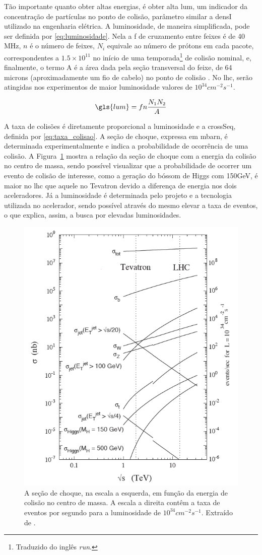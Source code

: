 Tão importante quanto obter altas energias, é obter alta
\gls{lum}, um indicador da concentração 
de partículas no ponto de colisão, parâmetro similar a \gls{densI} 
utilizado na engenharia elétrica. A luminosidade, de maneira
simplificada, pode ser definida por
\ref{eq:luminosidade}. Nela a \gls{f} de cruzamento entre feixes
é de 40 MHz, $n$ é o número de feixes, 
$N_i$ equivale ao número de prótons em
cada pacote, correspondentes a $1.5\times10^{11}$ no início de uma
temporada\footnote{Traduzido do inglês \emph{run}.} de colisão nominal, e,
finalmente, o termo A é a área dada pela seção transversal do feixe, 
de 64 microns (aproximadamente um fio de cabelo) no ponto de colisão
\cite{webLHC}. No \gls{lhc}, serão atingidas nos experimentos de maior luminosidade 
valores de $10^{34}cm^{-2}s^{-1}$.


\begin{equation} \label{eq:luminosidade}
\gls{lum}=fn\frac{N_1 N_2}{A}
\end{equation}

A taxa de colisões é diretamente proporcional a luminosidade e a \gls{crossSeq}, 
definida por \ref{eq:taxa_colisao}. A seção de choque, expressa em mbarn, 
é determinada experimentalmente e indica a probabilidade de ocorrência de uma colisão. 
A Figura~\ref{fig:lum_cross} mostra a relação da seção de choque com a energia
da colisão no centro de massa, sendo possível visualizar que a probabilidade 
de ocorrer um evento de colisão de interesse, como a geração do
bóssom de Higgs com 150GeV, é maior no \gls{lhc} 
que aquele no Tevatron devido a diferença de energia nos dois aceleradores.
Já a luminosidade é determinada pelo projeto e a tecnologia utilizada no 
acelerador, sendo possível através do mesmo elevar a taxa de eventos, o que
explica, assim, a busca por elevadas luminosidades.

\begin{figure}[h!t]
\centering
\includegraphics[width=.5\textwidth]{imagens/Lum_cross.png}
\caption{
A seção de choque, na escala a esquerda, em função da energia de colisão no
centro de massa. A escala a direita contêm a taxa de eventos por segundo 
para a luminosidade de $10^{34}cm^{-2}s^{-1}$. 
Extraído de \cite{ATLAS_HLT_DAQ}.}
\label{fig:lum_cross}
\end{figure}

